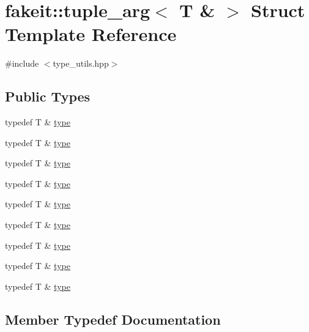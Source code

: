 \hypertarget{structfakeit_1_1tuple__arg_3_01T_01_6_01_4}{}\section{fakeit\+::tuple\+\_\+arg$<$ T \& $>$ Struct Template Reference}
\label{structfakeit_1_1tuple__arg_3_01T_01_6_01_4}


{\ttfamily \#include $<$type\+\_\+utils.\+hpp$>$}

\subsection*{Public Types}
\begin{DoxyCompactItemize}
\item 
typedef T \& \mbox{\hyperlink{structfakeit_1_1tuple__arg_3_01T_01_6_01_4_aeee261e6ee2cf07e3bc1fd7783d41a67}{type}}
\item 
typedef T \& \mbox{\hyperlink{structfakeit_1_1tuple__arg_3_01T_01_6_01_4_aeee261e6ee2cf07e3bc1fd7783d41a67}{type}}
\item 
typedef T \& \mbox{\hyperlink{structfakeit_1_1tuple__arg_3_01T_01_6_01_4_aeee261e6ee2cf07e3bc1fd7783d41a67}{type}}
\item 
typedef T \& \mbox{\hyperlink{structfakeit_1_1tuple__arg_3_01T_01_6_01_4_aeee261e6ee2cf07e3bc1fd7783d41a67}{type}}
\item 
typedef T \& \mbox{\hyperlink{structfakeit_1_1tuple__arg_3_01T_01_6_01_4_aeee261e6ee2cf07e3bc1fd7783d41a67}{type}}
\item 
typedef T \& \mbox{\hyperlink{structfakeit_1_1tuple__arg_3_01T_01_6_01_4_aeee261e6ee2cf07e3bc1fd7783d41a67}{type}}
\item 
typedef T \& \mbox{\hyperlink{structfakeit_1_1tuple__arg_3_01T_01_6_01_4_aeee261e6ee2cf07e3bc1fd7783d41a67}{type}}
\item 
typedef T \& \mbox{\hyperlink{structfakeit_1_1tuple__arg_3_01T_01_6_01_4_aeee261e6ee2cf07e3bc1fd7783d41a67}{type}}
\item 
typedef T \& \mbox{\hyperlink{structfakeit_1_1tuple__arg_3_01T_01_6_01_4_aeee261e6ee2cf07e3bc1fd7783d41a67}{type}}
\end{DoxyCompactItemize}


\subsection{Member Typedef Documentation}
\mbox{\label{structfakeit_1_1tuple__arg_3_01T_01_6_01_4_aeee261e6ee2cf07e3bc1fd7783d41a67}} 
